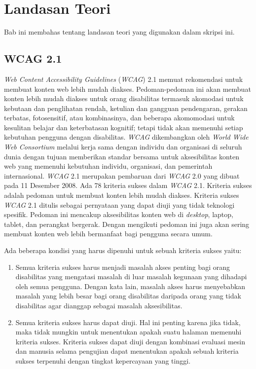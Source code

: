 \chapter{Landasan Teori}
\label{chap:teori}

Bab ini membahas tentang landasan teori yang digunakan dalam skripsi ini.

\section{WCAG 2.1}
\label{sec:WCAG2.1} 
\textit{Web Content Accessibility Guidelines} (\textit{WCAG}) 2.1 memuat rekomendasi untuk membuat konten web lebih mudah diakses. Pedoman-pedoman ini akan membuat konten lebih mudah diakses untuk orang disabilitas termasuk akomodasi untuk kebutaan dan penglihatan rendah, ketulian dan gangguan pendengaran, gerakan terbatas, fotosensitif, atau kombinasinya, dan beberapa akomomodasi untuk kesulitan belajar dan keterbatasan kognitif; tetapi tidak akan memenuhi setiap kebutuhan pengguna dengan disabilitas. \textit{WCAG} dikembangkan oleh \textit{World Wide Web Consortium} melalui kerja sama dengan individu dan organisasi di seluruh dunia dengan tujuan memberikan standar bersama untuk aksesibilitas konten web yang memenuhi kebutuhan individu, organisasi, dan pemerintah internasional. \textit{WCAG} 2.1 merupakan pembaruan dari \textit{WCAG} 2.0 yang dibuat pada 11 Desember 2008. Ada 78 kriteria sukses dalam \textit{WCAG} 2.1. Kriteria sukses adalah pedoman untuk membuat konten lebih mudah diakses. Kriteria sukses \textit{WCAG} 2.1 ditulis sebagai pernyataan yang dapat diuji yang tidak teknologi spesifik. Pedoman ini mencakup aksesibilitas konten web di \textit{desktop}, laptop, tablet, dan perangkat bergerak. Dengan mengikuti pedoman ini juga akan sering membuat konten web lebih bermanfaat bagi pengguna secara umum.

Ada beberapa kondisi yang harus dipenuhi untuk sebuah kriteria sukses yaitu:

\begin{enumerate}
	\item Semua kriteria sukses harus menjadi masalah akses penting bagi orang disabilitas yang mengatasi masalah di luar masalah kegunaan yang dihadapi oleh semua pengguna. Dengan kata lain, masalah akses harus menyebabkan masalah yang lebih besar bagi orang disabilitas daripada orang yang tidak disabilitas agar dianggap sebagai masalah aksesibilitas.
	\item Semua kriteria sukses harus dapat diuji. Hal ini penting karena jika tidak, maka tidak mungkin untuk menentukan apakah suatu halaman memenuhi kriteria sukses. Kriteria sukses dapat diuji dengan kombinasi evaluasi mesin dan manusia selama pengujian dapat menentukan apakah sebuah kriteria sukses terpenuhi dengan tingkat kepercayaan yang tinggi.
\end{enumerate}

